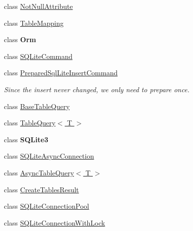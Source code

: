 \begin{DoxyCompactItemize}
\item 
class \hyperlink{classSQLite_1_1NotNullAttribute}{Not\-Null\-Attribute}
\item 
class \hyperlink{classSQLite_1_1TableMapping}{Table\-Mapping}
\item 
class {\bfseries Orm}
\item 
class \hyperlink{classSQLite_1_1SQLiteCommand}{S\-Q\-Lite\-Command}
\item 
class \hyperlink{classSQLite_1_1PreparedSqlLiteInsertCommand}{Prepared\-Sql\-Lite\-Insert\-Command}
\begin{DoxyCompactList}\small\item\em Since the insert never changed, we only need to prepare once. \end{DoxyCompactList}\item 
class \hyperlink{classSQLite_1_1BaseTableQuery}{Base\-Table\-Query}
\item 
class \hyperlink{classSQLite_1_1TableQuery_3_01T_01_4}{Table\-Query$<$ T $>$}
\item 
class {\bfseries S\-Q\-Lite3}
\item 
class \hyperlink{classSQLite_1_1SQLiteAsyncConnection}{S\-Q\-Lite\-Async\-Connection}
\item 
class \hyperlink{classSQLite_1_1AsyncTableQuery_3_01T_01_4}{Async\-Table\-Query$<$ T $>$}
\item 
class \hyperlink{classSQLite_1_1CreateTablesResult}{Create\-Tables\-Result}
\item 
class \hyperlink{classSQLite_1_1SQLiteConnectionPool}{S\-Q\-Lite\-Connection\-Pool}
\item 
class \hyperlink{classSQLite_1_1SQLiteConnectionWithLock}{S\-Q\-Lite\-Connection\-With\-Lock}
\end{DoxyCompactItemize}
